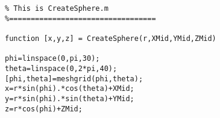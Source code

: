 \lstset{basicstyle=\footnotesize\ttfamily}
    
\begin{lstlisting}[breaklines]
%==================================
% This is CreateSphere.m
%==================================

function [x,y,z] = CreateSphere(r,XMid,YMid,ZMid)
 
phi=linspace(0,pi,30); 
theta=linspace(0,2*pi,40); 
[phi,theta]=meshgrid(phi,theta); 
x=r*sin(phi).*cos(theta)+XMid; 
y=r*sin(phi).*sin(theta)+YMid; 
z=r*cos(phi)+ZMid; 


\end{lstlisting}